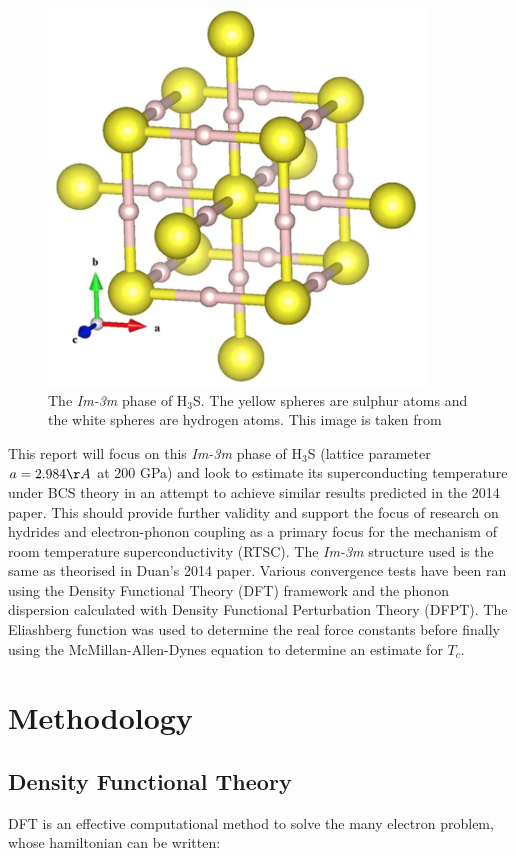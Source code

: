 \documentclass[a4paper,12pt]{article}
\begin{document}
 \begin{figure}[h!!!]
 	\centering
 	\includegraphics[width=10cm]{H3s_im-3m}
 	\caption{The \textit{Im-3m} phase of H$_3$S. The yellow spheres are sulphur atoms and the white spheres are hydrogen atoms. This image is taken from \cite{duan}}
 	\label{fig:im3m}
 \end{figure}

\bigskip

\noindent This report will focus on this \textit{Im-3m} phase of H$_3$S (lattice parameter $a = 2.984 \AA$ at 200 GPa) and look to estimate its superconducting temperature under BCS theory in an attempt to achieve similar results predicted in the 2014 paper. This should provide further validity and support the focus of research on hydrides and electron-phonon coupling as a primary focus for the mechanism of room temperature superconductivity (RTSC). The \textit{Im-3m} structure used is the same as theorised in Duan's 2014 paper. Various convergence tests have been ran using the Density Functional Theory (DFT) framework and the phonon dispersion calculated with Density Functional Perturbation Theory (DFPT). The Eliashberg function was used to determine the real force constants before finally using the McMillan-Allen-Dynes equation to determine an estimate for $T_c$.
 

\section{Methodology}

\subsection{Density Functional Theory}
DFT is an effective computational method to solve the many electron problem, whose hamiltonian can be written:
\end{document}
